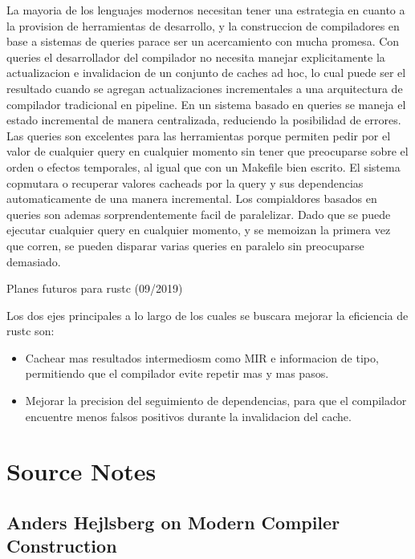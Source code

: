 \documentclass[12pt, a4paper]{report}
\begin{document}
La mayoria de los lenguajes modernos necesitan tener una estrategia en cuanto a la provision de herramientas de desarrollo, y la construccion de compiladores en base a sistemas de queries parace ser un acercamiento con mucha promesa.
Con queries el desarrollador del compilador no necesita manejar explicitamente la actualizacion e invalidacion de un conjunto de caches ad hoc, lo cual puede ser el resultado cuando se agregan actualizaciones incrementales a una arquitectura de compilador tradicional en pipeline.
En un sistema basado en queries se maneja el estado incremental de manera centralizada, reduciendo la posibilidad de errores.
Las queries son excelentes para las herramientas porque permiten pedir por el valor de cualquier query en cualquier momento sin tener que preocuparse sobre el orden o efectos temporales, al igual que con un Makefile bien escrito.
El sistema copmutara o recuperar valores cacheads por la query y sus dependencias automaticamente de una manera incremental.
Los compialdores basados en queries son ademas sorprendentemente facil de paralelizar.
Dado que se puede ejecutar cualquier query en cualquier momento, y se memoizan la primera vez que corren, se pueden disparar varias queries en paralelo sin preocuparse demasiado.
\cite{olle_query_based}

Planes futuros para rustc (09/2019)

Los dos ejes principales a lo largo de los cuales se buscara mejorar la eficiencia de rustc son:
\begin{itemize}[noitemsep]
\item Cachear mas resultados intermediosm como MIR e informacion de tipo, permitiendo que el compilador evite repetir mas y mas pasos.
\item Mejorar la precision del seguimiento de dependencias, para que el compilador encuentre menos falsos positivos durante la invalidacion del cache.
\end{itemize}
\cite{rust_blog_incremental_compilation}

\chapter*{Source Notes}

\section*{Anders Hejlsberg on Modern Compiler Construction}
\cite{hejlsberg_modern_compiler_construction}
\end{document}
